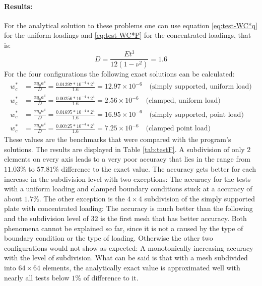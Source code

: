    \paragraph{Results:} For the analytical solution to these problems one can use equation \ref{eq:test-WC*q} for the uniform loadings and \ref{eq:test-WC*P} for the concentrated loadings, that is:
   \begin{equation*}
   D = \frac{E t^3}{12 \left( 1 - \nu^2 \right)} = 1.6
   \end{equation*}
   For the four configurations the following exact solutions can be calculated:
   \begin{align*}
   w_c^* &= \frac{\alpha q_0 a^4}{D} = \frac{0.01297 * 10^{-4} * 2^4}{1.6} = 12.97\times 10^{-6}\quad \text{(simply supported, uniform load)}\\
   w_c^* &= \frac{\alpha q_0 a^4}{D} = \frac{0.00256 * 10^{-4} * 2^4}{1.6} = 2.56\times 10^{-6}\quad \text{(clamped, uniform load)}\\
   w_c^* &= \frac{\alpha q_0 a^4}{D} = \frac{0.01695 * 10^{-4} * 2^4}{1.6} = 16.95\times 10^{-6}\quad \text{(simply supported, point load)}\\
   w_c^* &= \frac{\alpha q_0 a^4}{D} = \frac{0.00725 * 10^{-4} * 2^4}{1.6} = 7.25\times 10^{-6}\quad \text{(clamped point load)}
   \end{align*}
   These values are the benchmarks that were compared with the program's solutions. The results are displayed in Table \ref{tab:testF}. A subdivision of only 2 elements on every axis leads to a very poor accuracy that lies in the range from $11.03\%$ to $57.81\%$ difference to the exact value. The accuracy gets better for each increase in the subdivision level with two exceptions: The accuracy for the tests with a uniform loading and clamped boundary conditions stuck at a accuracy of about $1.7\%$. The other exception is the $4\!\times\!4$ subdivision of the simply supported plate with concentrated loading: The accuracy is much better than the following and the subdivision level of 32 is the first mesh that has better accuracy. Both phenomena cannot be explained so far, since it is not a caused by the type of boundary condition or the type of loading. Otherwise the other two configurations would not show as expected: A monotonically increasing accuracy with the level of subdivision. What can be said is that with a mesh subdivided into $64\!\times\!64$ elements, the analytically exact value is approximated well with nearly all tests below $1\%$ of difference to it.
    
